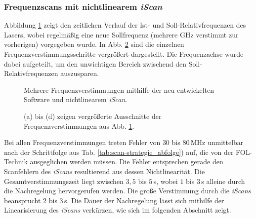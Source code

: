 \subsubsection{Frequenzscans mit nichtlinearem
\textit{iScan}}\label{subsubsec:frequenz_scans_nichtlineares_iScan}
Abbildung \ref{fig:laserscan_LUT-reset} zeigt den zeitlichen Verlauf der
Ist- und Soll-Relativfrequenzen des Lasers, wobei regelmäßig eine neue
Sollfrequenz (mehrere GHz verstimmt zur vorherigen) vorgegeben
wurde. In Abb. \ref{fig:laserscan_LUT-reset_zoom} sind die einzelnen
Frequenzverstimmungsschritte vergrößert dargestellt. Die Frequenzachse wurde
dabei aufgeteilt, um den unwichtigen Bereich zwischend den
Soll-Relativfrequenzen auszusparen.
\begin{figure}[h]
	 	\centering
	 	\footnotesize
		
		\caption[Frequenzscan, nichtlineares \textit{iScan}]{Mehrere
		Frequenzverstimmungen mithilfe der neu entwickelten Software und nichtlinearem
		\textit{iScan}.}
		\label{fig:laserscan_LUT-reset}
\end{figure}
\begin{figure}[hp]
 	\centering
 	\footnotesize
	\caption[Frequenzscan, nichtlineares \textit{iScan}, vergrößert]{(a) bis (d)
	zeigen vergrößerte Ausschnitte der Frequenzverstimmungen aus Abb.
	\ref{fig:laserscan_LUT-reset}.}
	\label{fig:laserscan_LUT-reset_zoom}
\end{figure}
Bei allen Frequenzverstimmungen treten Fehler von $30$ bis $80\,$MHz unmittelbar
nach der Schrittfolge aus Tab.
\ref{tab:scan-strategie_abfolge}) auf, die von der FOL-Technik ausgeglichen
werden müssen. Die Fehler entsprechen gerade den Scanfehlern des \textit{iScans}
resultierend aus dessen Nichtlinearität. Die Gesamtverstimmungszeit liegt
zwischen $3,5$ bis $5\,$s, wobei $1$ bis $3\,$s alleine durch die Nachregelung
hervorgerufen werden. Die große Verstimmung durch die \textit{iScans}
beansprucht $2$ bis $3\,$s. Die Dauer der Nachregelung lässt sich mithilfe
der Linearisierung des \textit{iScans} verkürzen, wie sich im folgenden Abschnitt zeigt.

